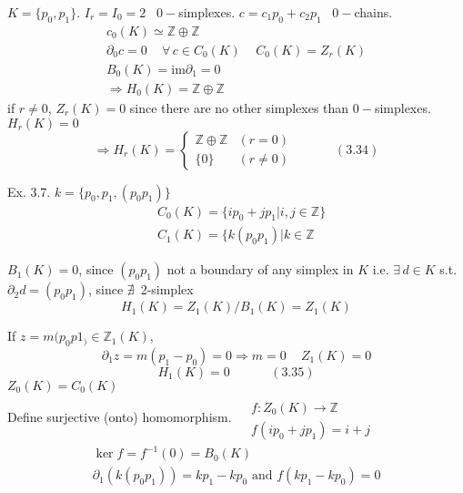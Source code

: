 \documentclass{book}
\newcommand{\exercisehead}[1]
  {\smallskip
   \noindent{\large\bf Exercise #1.}
   }
\begin{document}
\exercisehead{3.1}
  $K = \lbrace p_0, p_1 \rbrace$. $I_r = I_0 = 2$ \, $0-$simplexes.  $c=  c_1 p_0 + c_2 p_1$ \, $0-$chains.  \\
\[
\begin{gathered}
  c_0(K) \simeq \mathbb{Z} \oplus \mathbb{Z} \\
  \partial_0 c = 0 \quad \, \forall \, c \in C_0(K) \quad \, C_0(K) = Z_r(K) \\
  B_0(K) = \text{im}{\partial_1} =0 \\
  \Longrightarrow H_0(K) = \mathbb{Z} \oplus \mathbb{Z} 
\end{gathered}
\]
if $r\neq 0$, $Z_r(K) = 0$ since there are no other simplexes than $0-$simplexes.  $H_r(K) =0$
\begin{equation}
\Longrightarrow H_r(K) = \begin{cases} \mathbb{Z} \oplus \mathbb{Z} & (r=0) \\ 
  \lbrace 0 \rbrace & (r\neq 0) \end{cases} \quad \quad \quad \, (3.34)
\end{equation}

Ex. 3.7. $k = \lbrace p_0, p_1, (p_0 p_1) \rbrace$ \\
\[
\begin{aligned}
  & C_0(K)  = \lbrace i p_0 + j p_1 | i,j \in \mathbb{Z} \rbrace \\ 
  & C_1(K) = \lbrace k(p_0 p_1) | k \in \mathbb{Z}
\end{aligned}
\]

$B_1(K) = 0$, since $(p_0 p_1)$ not a boundary of any simplex in $K$ i.e. $\exists \, d \in K$ s.t. $\partial_2 d = (p_0 p_1)$, since $\nexists \, $ 2-simplex 
\[
H_1(K) = Z_1(K)/ B_1(K) = Z_1(K)
\]

If $z = m(p_0 p1_) \in \mathbb{Z}_1(K)$, 
\[
\partial_1 z = m (p_1-  p_0) = 0 \Longrightarrow m = 0 \quad \, Z_1(K) = 0 
\]
\begin{equation}
  H_1(K) = 0 \quad \quad \quad \, (3.35)
\end{equation}
$Z_0(K) = C_0(K)$ \\

Define surjective (onto) homomorphism.  $\begin{aligned} & \quad  \\ 
  & f: Z_0(K) \to \mathbb{Z} \\
  & f(ip_0 + jp_1) = i+ j \end{aligned}$ 
\[
\begin{gathered}
  \ker{f} = f^{-1}(0) = B_0(K) \\ 
  \partial_1(k(p_0 p_1)) = kp_1 - k p_0 \text{ and } f(kp_1 - k p_0) = 0
\end{gathered}
\]
\end{document}
